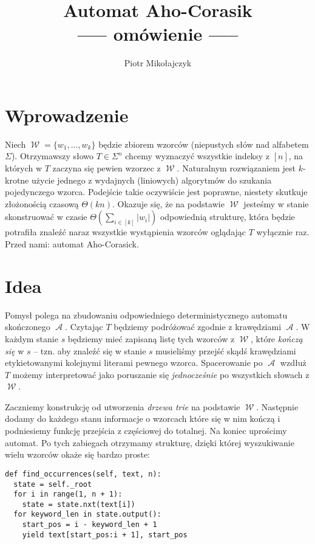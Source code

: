 \documentclass{article}
\title{Automat Aho-Corasik\\\large{----- omówienie -----}}
\author{Piotr Mikołajczyk}
\date{}
\DeclareMathOperator{\W}{\mathcal{W}}
\DeclareMathOperator{\A}{\mathcal{A}}
\begin{document}
\maketitle

% 
% 
% 
% 
% 

\section{Wprowadzenie}

Niech $\W=\{w_1,...,w_k\}$ będzie zbiorem wzorców (niepustych słów nad alfabetem $\Sigma$). Otrzymawszy słowo $T\in\Sigma^n$ chcemy wyznaczyć wszystkie indeksy z $[n]$, na których w $T$ zaczyna się pewien wzorzec z $\W$. Naturalnym rozwiązaniem jest $k$-krotne użycie jednego z wydajnych (liniowych) algorytmów do szukania pojedynczego wzorca. Podejście takie oczywiście jest poprawne, niestety skutkuje złożonością czasową $\Theta(kn)$. Okazuje się, że na podstawie $\W$ jesteśmy w stanie skonstruować w czasie $\Theta(\sum_{i\in[k]}|w_i|)$ odpowiednią strukturę, która będzie potrafiła znaleźć naraz wszystkie wystąpienia wzorców oglądając $T$ wyłącznie raz. Przed nami: automat Aho-Corasick.

\section{Idea}

Pomysł polega na zbudowaniu odpowiedniego deterministycznego automatu skończonego $\A$. Czytając $T$ będziemy podróżować zgodnie z krawędziami $\A$. W każdym stanie $s$ będziemy mieć zapisaną listę tych wzorców z $\W$, które \textit{kończą się} w $s$ -- tzn. aby znaleźć się w stanie $s$ musieliśmy przejść skądś krawędziami etykietowanymi kolejnymi literami pewnego wzorca. Spacerowanie po $\A$ wzdłuż $T$ możemy interpretować jako poruszanie się \textit{jednocześnie} po wszystkich słowach z $\W$.

Zaczniemy konstrukcję od utworzenia \textit{drzewa trie} na podstawie $\W$. Następnie dodamy do każdego stanu informacje o wzorcach które się w nim kończą i podniesiemy funkcję przejścia z częściowej do totalnej. Na koniec uprościmy automat. Po tych zabiegach otrzymamy strukturę, dzięki której wyszukiwanie wielu wzorców okaże się bardzo proste:

\begin{verbatim}
def find_occurrences(self, text, n):
  state = self._root
  for i in range(1, n + 1):
    state = state.nxt(text[i])
  for keyword_len in state.output():
    start_pos = i - keyword_len + 1
    yield text[start_pos:i + 1], start_pos
\end{verbatim}
\end{document}
